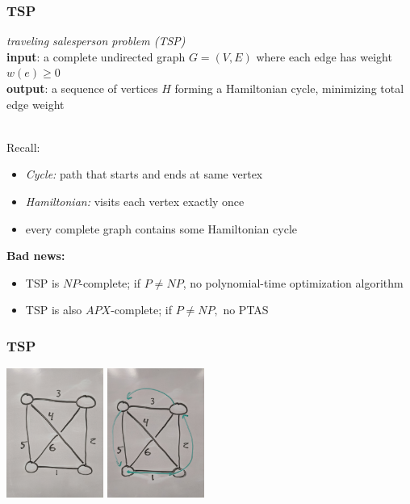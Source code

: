 \documentclass[10pt,aspectratio=169]{beamer}
\newcommand{\stanza}{ \\~\ }
\begin{document}
\begin{frame} \frametitle{TSP}
  \emph{traveling salesperson problem (TSP)} \\
  \textbf{input}: a complete undirected graph $G=(V,E)$ where each edge has weight $w(e) \geq 0$ \\
  \textbf{output}: a sequence of vertices $H$ forming a Hamiltonian cycle, minimizing
  total edge weight
  \stanza
  
  Recall:
  \begin{itemize}
    \item \emph{Cycle:} path that starts and ends at same vertex
    \item \emph{Hamiltonian:} visits each vertex exactly once
    \item every complete graph contains some Hamiltonian cycle
  \end{itemize}
  
  \textbf{Bad news:}
  \begin{itemize}
    \item TSP is $NP$-complete; if $P \ne NP$, no polynomial-time optimization algorithm
    \item TSP is also $APX$-complete; if $P \ne NP,$ no PTAS
  \end{itemize}
  \end{frame}
  
  \begin{frame} \frametitle{TSP}
    \begin{center}
      \includegraphics[height=120pt]{13-tsp-input.jpg}
      \includegraphics[height=120pt]{13-tsp-output.jpg}
    \end{center}
  \end{frame}
  
\end{document}
